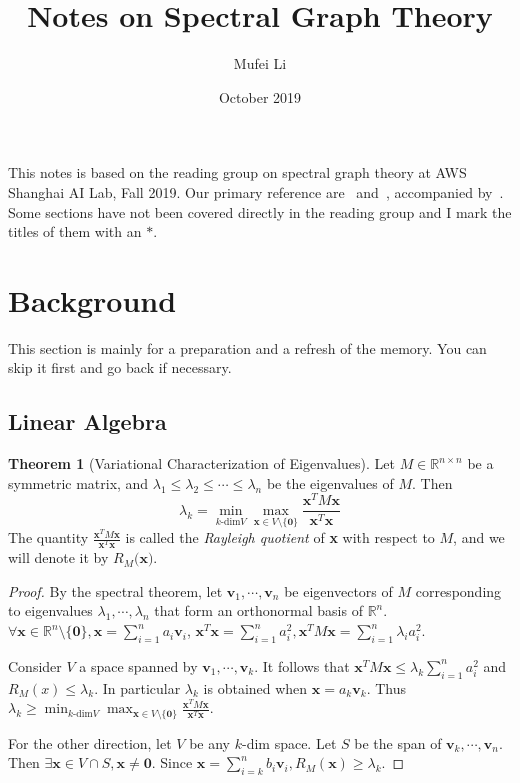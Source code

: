 \documentclass[a4paper]{article}
\title{Notes on Spectral Graph Theory}
\author{Mufei Li}
\date{October 2019}
\theoremstyle{definition}
\newtheorem{theorem}{Theorem}[section]
\begin{document}
\maketitle

This notes is based on the reading group on spectral graph theory at AWS Shanghai AI Lab, Fall 2019. Our primary reference are~\cite{Luca_notes_2016} and~\cite{Spielman_notes_2018}, accompanied by~\cite{Luxburg07}. Some sections have not been covered directly in the reading group and I mark the titles of them with an $\ast$.

\tableofcontents

\section{Background}

This section is mainly for a preparation and a refresh of the memory. You can skip it first and go back if necessary.

\subsection{Linear Algebra}

\begin{theorem}[Variational Characterization of Eigenvalues]
\label{thm:var_char}
Let $M\in\mathbb{R}^{n\times n}$ be a symmetric matrix, and $\lambda_1\leq \lambda_2\leq \cdots \leq \lambda_n$ be the eigenvalues of $M$. Then
\begin{equation}
    \lambda_k = \min_{k\text{-dim} V}\max_{\textbf{x}\in V\setminus\{\textbf{0}\}}\frac{\textbf{x}^T M\textbf{x}}{\textbf{x}^T\textbf{x}}
\end{equation}
The quantity $\frac{\textbf{x}^T M\textbf{x}}{\textbf{x}^T\textbf{x}}$ is called the \textit{Rayleigh quotient} of \textbf{x} with respect to $M$, and we will denote it by $R_M(\textbf{x)}$.
\end{theorem}

\begin{proof}
By the spectral theorem, let $\textbf{v}_1, \cdots, \textbf{v}_n$ be eigenvectors of $M$ corresponding to eigenvalues $\lambda_1, \cdots, \lambda_n$ that form an orthonormal basis of $\mathbb{R}^n$. $\forall \textbf{x}\in \mathbb{R}^{n}\setminus\{\textbf{0}\}, \textbf{x}=\sum_{i=1}^{n}a_i\textbf{v}_i$, $\textbf{x}^{T}\textbf{x}=\sum_{i=1}^{n}a_i^2, \textbf{x}^{T}M\textbf{x}=\sum_{i=1}^{n}\lambda_i a_i^2$.

Consider $V$ a space spanned by $\textbf{v}_1,\cdots, \textbf{v}_k$. It follows that $\textbf{x}^{T}M\textbf{x}\leq \lambda_k\sum_{i=1}^{n}a_i^2$ and $R_M(x)\leq \lambda_k$. In particular $\lambda_k$ is obtained when $\textbf{x}=a_k\textbf{v}_k$. Thus $\lambda_k \geq \min_{k\text{-dim} V}\max_{\textbf{x}\in V\setminus\{\textbf{0}\}}\frac{\textbf{x}^T M\textbf{x}}{\textbf{x}^T\textbf{x}}$.

For the other direction, let $V$ be any $k$-dim space. Let $S$ be the span of $\textbf{v}_k,\cdots,\textbf{v}_{n}$. Then $\exists \textbf{x}\in V\cap S, \textbf{x}\neq \textbf{0}$. Since $\textbf{x}=\sum_{i=k}^{n}b_i\textbf{v}_i, R_M(\textbf{x})\geq \lambda_k$.
\end{proof}
\end{document}
